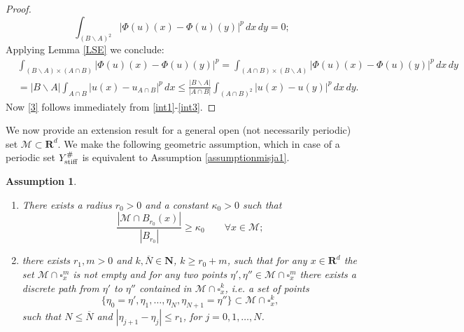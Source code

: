 \documentclass[11pt]{article}
\newcommand\stiff{{\rm stiff}}
\newcommand{\R}{\mathbf{R}}
\def\M{\mathcal{M}}
\newcommand\N{\mathbf{N}}
\newtheorem{assumption}[theorem]{Assumption}
\theoremstyle{remark}
\begin{document}
\begin{appendices}
\begin{proof}
\begin{equation}
		\int_{( B\backslash A)^2} |\Phi(u)(x)-\Phi(u)(y)|^p \, dx\,dy=0;
	\end{equation}
	Applying Lemma \ref{LSE} we conclude:
	\begin{equation}	
	\begin{aligned}
		\label{int3}
		&\int_{( B \backslash A)\times(A \cap  B) }|\Phi(u)(x)-\Phi(u)(y)|^p
		= \int_{(A \cap  B)\times ( B \backslash A)}|\Phi(u)(x)-\Phi(u)(y)|^p \, dx\,dy
		\\
	&	= | B \backslash A|\int_{A \cap  B} |u(x)-u_{A \cap   B}|^p \,dx
		\leq \frac{ | B \backslash A|}{|A \cap   B|} \int_{(A \cap  B)^2} |u(x)-u(y)|^p \,dx \,dy.
	\end{aligned}
\end{equation} 	
	Now \eqref{3} follows immediately from \eqref{int1}-\eqref{int3}.
	
\end{proof} 	



We now provide an extension result for a general open (not necessarily periodic) set   $\M \subset \R^d$. We make the following geometric assumption, which in case of a periodic set $Y_\stiff^\#$ is equivalent to Assumption \ref{assumptionmisja1}.

\begin{assumption}\label{assumptionmisja}
	\begin{enumerate}
		\item There exists a radius $r_0>0$ and a constant $\kappa_0>0$ such that
		\begin{equation*}
			  \frac{|\M \cap B_{r_0}(x)|}{|B_{r_0}|} \geq \kappa_0 \qquad \forall x\in \M;
		\end{equation*}
		
		\item there exists $r_1, m>0$ and $k, \overline{N}\in \N$, $k \ge r_0 + m$,  such that for any $x\in \R^d$ the set $\M \cap \square_x^m$ is not empty and for any two points $\eta', \eta''\in \M \cap \square_x^m$ there exists a discrete path from $\eta'$ to $\eta''$ contained in $\M\cap \square^k_x$, \textit{i.e.} a set of points
		\begin{equation*}
			\{\eta_0=\eta', \eta_1, \dots, \eta_N, \eta_{N+1}=\eta''\} \subset \M\cap \square^k_x,
		\end{equation*}
		such that $N\le \overline{N}$ and 	 $|\eta_{j+1}-\eta_{j}|\leq r_1$, for $j=0,1,\dots, N$.
	\end{enumerate}
\end{assumption}


\end{appendices}
\end{document}
